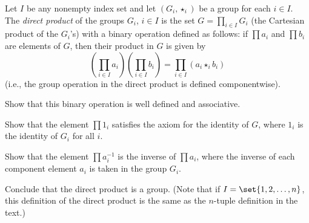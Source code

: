 \begin{exercise}\label{ex5.1.15}
    Let $I$ be any nonempty index set and let $(G_i, \star_i)$ be a group for each $i \in I$. The \textit{direct product} of the groups $G_i$, $i \in I$ is the set $G = \prod_{i \in I} G_i$ (the Cartesian product of the $G_i$'s) with a binary operation defined as follows: if $\prod a_i$ and $\prod b_i$ are elements of $G$, then their product in $G$ is given by
    \[\left(\prod_{i \in I} a_i\right)\left(\prod_{i \in I} b_i\right) = \prod_{i \in I} (a_i \star_i b_i)\]
    (i.e., the group operation in the direct product is defined componentwise).
    \begin{subproblems}
        \item Show that this binary operation is well defined and associative.
        \item Show that the element $\prod 1_i$ satisfies the axiom for the identity of $G$, where $1_i$ is the identity of $G_i$ for all $i$.
        \item Show that the element $\prod a_i^{-1}$ is the inverse of $\prod a_i$, where the inverse of each component element $a_i$ is taken in the group $G_i$.
    \end{subproblems}
    Conclude that the direct product is a group. (Note that if $I = \set{1, 2, \ldots, n}$, this definition of the direct product is the same as the $n$-tuple definition in the text.)
\end{exercise}

